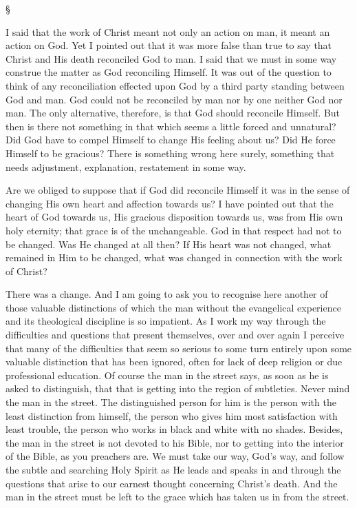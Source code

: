 \documentclass[12pt,letterpaper,oneside]{book}
\begin{document}
\begin{center}
\S
\end{center}

I said that the work of Christ meant not only 
an action on man, it meant an action on God. 
Yet I pointed out that it was more false than 
true to say that Christ and His death reconciled 
God to man. I said that we must in some way 
construe the matter as God reconciling Himself. 
It was out of the question to think of any 
reconciliation effected upon God by a third 
party standing between God and man. God 
could not be reconciled by man nor by one 
neither God nor man. The only alternative, 
therefore, is that God should reconcile Himself. 
But then is there not something in that which 
seems a little forced and unnatural? Did God 
have to compel Himself to change His feeling 
about us? Did He force Himself to be gracious? 
There is something wrong here surely, something 
that needs adjustment, explanation, restatement 
in some way. 

Are we obliged to suppose that if God did 
reconcile Himself it was in the sense of changing 
His own heart and affection towards us? I 
have pointed out that the heart of God towards 
us, His gracious disposition towards us, was 
from His own holy eternity; that grace is of the 
unchangeable. God in that respect had not to 
be changed. Was He changed at all then? If 
His heart was not changed, what remained in 
Him to be changed, what was changed in 
connection with the work of Christ? 

There was a change. And I am going to ask 
you to recognise here another of those valuable 
distinctions of which the man without the evangelical 
experience and its theological discipline 
is so impatient. As I work my way through 
the difficulties and questions that present themselves, 
over and over again I perceive that many 
of the difficulties that seem so serious to some 
turn entirely upon some valuable distinction 
that has been ignored, often for lack of deep religion 
or due professional education. Of course 
the man in the street says, as soon as he is 
asked to distinguish, that that is getting into 
the region of subtleties. Never mind the man 
in the street. The distinguished person for him 
is the person with the least distinction from 
himself, the person who gives him most satisfaction 
with least trouble, the person who works 
in black and white with no shades. Besides, the 
man in the street is not devoted to his Bible, nor 
to getting into the interior of the Bible, as you 
preachers are. We must take our way, God's 
way, and follow the subtle and searching Holy 
Spirit as He leads and speaks in and through 
the questions that arise to our earnest thought 
concerning Christ's death. And the man in the 
street must be left to the grace which has taken 
us in from the street. 
\end{document}
